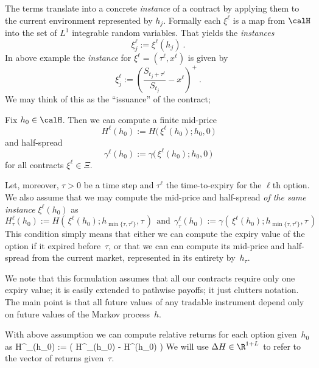 \documentclass{hbarticle}
\begin{document}
    The terms translate into a concrete \emph{instance} of a contract
    by applying them to the current environment represented by $h_j$.
    Formally each $\xi^\ell$
    is a map from $\calH$ into the set of $L^1$ integrable random variables. That yields the \emph{instances}
    $$
         \xi^\ell_j := \xi^\ell(h_j) \ .
    $$
    In above
    example the \emph{instance} for $\xi^\ell = (\tau^\ell, x^\ell)$
    is given by
    $$
        \xi^\ell_j := \left( \frac{ S_{t_j+\tau^\ell}}{ S_{t_j} } - x^\ell \right)^+ \ .
    $$
    We may think of this as the ``issuance'' of the contract; 
    \begin{assumption}
        Fix $h_0\in \calH $.  Then we can compute a finite mid-price
        $$
            H^\ell(h_0):= H\big(\, \xi^\ell(h_0); h_0, 0\, \big)
        $$
        and half-spread
        $$
            \gamma^\ell(h_0):= \gamma\big(\, \xi^\ell(h_0); h_0, 0\, \big)
        $$
        for all contracts $\xi^\ell\in\Xi$.      

        Let, moreover, $\tau > 0$ be a time step and $\tau^\ell$ the time-to-expiry for the $\ell$th option.
        We also assume that we may compute
        the mid-price and half-spread \emph{of the same instance} $\xi^\ell(h_0)$ as
        $$
            H^\ell_\tau(h_0):= H\left(\, \xi^\ell(h_0); h_{\min\{ \tau, \tau^\ell \}},\tau\, \right) \ \ \mbox{and}\ \
            \gamma^\ell_\tau(h_0):= \gamma\!\left(\, \xi^\ell(h_0); h_{\min\{ \tau, \tau^\ell \}},\tau \, \right)
        $$
        This condition simply means that either we can compute the expiry value of the option if it
        expired before~$\tau$, or that we can can compute its mid-price and half-spread from
        the current market, represented in its entirety by~$h_\tau$.
    \end{assumption}

    \begin{remark}
        We note that this
        formulation assumes that all our contracts require only one expiry value; it is easily extended
        to pathwise payoffs; it just clutters notation. The main point is that all future values of
        any tradable instrument depend
        only on future values of the Markov process~$h$.
    \end{remark}
    With above assumption we can compute relative returns for each option given~$h_0$ as
    \eq{ret}
        \Delta H^\ell_\tau(h_0) :=  \left(  H^\ell_\tau(h_0)  - H^\ell(h_0)  \right)
    \eqend
    We will use $\Delta H\in\R^{1+L}$ to refer to the vector of returns given~$\tau$.
    
\end{document}
